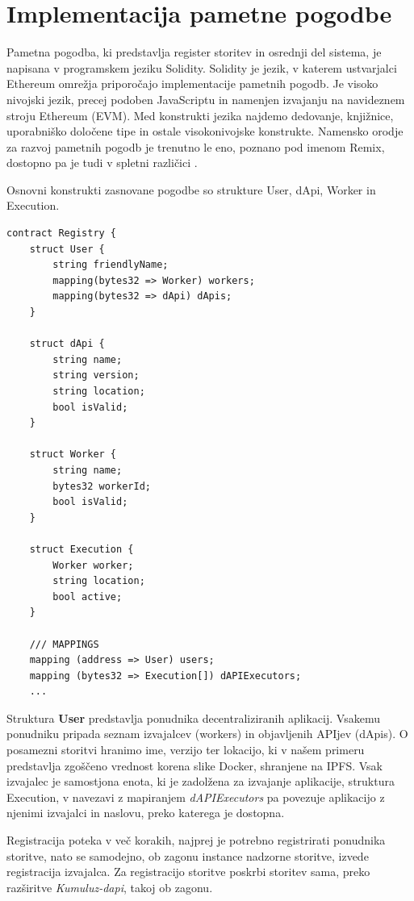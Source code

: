 \documentclass[a4paper, 12pt]{book}
\begin{document}
\section{Implementacija pametne pogodbe}
Pametna pogodba, ki predstavlja register storitev in osrednji del sistema, je napisana v programskem jeziku Solidity.
Solidity je jezik, v katerem ustvarjalci Ethereum omrežja priporočajo implementacije pametnih pogodb.
Je visoko nivojski jezik, precej podoben JavaScriptu in namenjen izvajanju na navideznem stroju Ethereum (EVM).
Med konstrukti jezika najdemo dedovanje, knjižnice, uporabniško določene tipe in ostale visokonivojske konstrukte.
Namensko orodje za razvoj pametnih pogodb je trenutno le eno, poznano pod imenom Remix, dostopno pa je tudi v spletni različici
\cite{solidityDocs}.

Osnovni konstrukti zasnovane pogodbe so strukture User, dApi, Worker in Execution.

\begin{lstlisting}
contract Registry {
	struct User {
		string friendlyName;
		mapping(bytes32 => Worker) workers;
		mapping(bytes32 => dApi) dApis;
	}
	
	struct dApi {
		string name;
		string version;
		string location;
		bool isValid;
	}
	
	struct Worker {
		string name;
		bytes32 workerId;
		bool isValid;
	}
	
	struct Execution {
		Worker worker;
		string location;
		bool active;
	}
	
 	/// MAPPINGS
	mapping (address => User) users;
	mapping (bytes32 => Execution[]) dAPIExecutors;
	...
\end{lstlisting}

Struktura \textbf{User} predstavlja ponudnika decentraliziranih aplikacij.
Vsakemu ponudniku pripada seznam izvajalcev (workers) in objavljenih APIjev (dApis).
O posamezni storitvi hranimo ime, verzijo ter lokacijo, ki v našem primeru predstavlja zgoščeno vrednost korena slike Docker, shranjene na IPFS.
Vsak izvajalec je samostjona enota, ki je zadolžena za izvajanje aplikacije, struktura Execution, v navezavi z mapiranjem \textit{dAPIExecutors} pa povezuje aplikacijo z njenimi izvajalci in naslovu, preko katerega je dostopna.

Registracija poteka v več korakih, najprej je potrebno registrirati ponudnika storitve, nato se samodejno, ob zagonu instance nadzorne storitve, izvede registracija izvajalca.
Za registracijo storitve poskrbi storitev sama, preko razširitve \textit{Kumuluz-dapi}, takoj ob zagonu.
\end{document}
